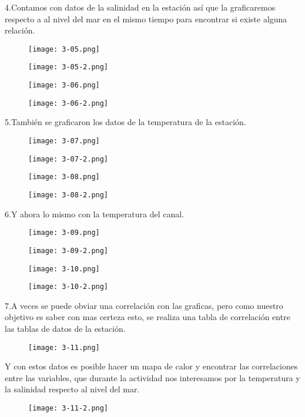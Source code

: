 \documentclass{article}
\begin{document}
\clearpage
4.Contamos con datos de la salinidad en la estación así que la graficaremos respecto a al nivel del mar en el mismo tiempo para encontrar si existe alguna relación.\\
\begin{figure}[h]
  \texttt{[image: 3-05.png]}
\end{figure}
\begin{figure}[h]
  \texttt{[image: 3-05-2.png]}
\end{figure}
\begin{figure}[h]
  \texttt{[image: 3-06.png]}
\end{figure}
\begin{figure}[h]
  \texttt{[image: 3-06-2.png]}
\end{figure}

\clearpage
5.También se graficaron los datos de la temperatura de la estación.\\
\begin{figure}[h]
  \texttt{[image: 3-07.png]}
\end{figure}

\begin{figure}[h]
  \texttt{[image: 3-07-2.png]}
\end{figure}

\begin{figure}[h]
  \texttt{[image: 3-08.png]}
\end{figure}
\begin{figure}[h]
  \texttt{[image: 3-08-2.png]}
\end{figure}
\clearpage

6.Y ahora lo mismo con la temperatura del canal.\\
\begin{figure}[h]
  \texttt{[image: 3-09.png]}
\end{figure}
\begin{figure}[h]
  \texttt{[image: 3-09-2.png]}
\end{figure}
\begin{figure}[h]
  \texttt{[image: 3-10.png]}
\end{figure}
\begin{figure}[h]
  \texttt{[image: 3-10-2.png]}
\end{figure}
\clearpage
7.A veces se puede obviar una correlación con las graficas, pero como nuestro objetivo es saber con mas certeza esto, se realiza una tabla de correlación entre las tablas de datos de la estación.\\
\begin{figure}[h]
  \texttt{[image: 3-11.png]}
\end{figure}
Y con estos datos es posible hacer un mapa de calor y encontrar las correlaciones entre las variables, que durante la actividad nos interesamos por la temperatura y la salinidad respecto al nivel del mar.
\begin{figure}[h]
  \texttt{[image: 3-11-2.png]}
\end{figure}
\clearpage
\end{document}
